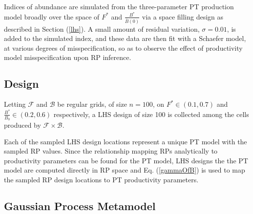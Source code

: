 %
%


%

Indices of abundance are simulated from the three-parameter PT production model
broadly over the space of $F^*$ and $\frac{B^*}{\bar B(0)}$ via a space filling
design as described in Section (\ref{lhs}). A small amount of residual variation,
$\sigma=0.01$, is added to the simulated index, and these data are then fit with a
Schaefer model, at various degrees of misspecification, so as to observe the
effect of productivity model misspecification upon RP inference.

%
\subsection{Design}

%
Letting $\mathcal{F}$ and $\mathcal{B}$ be regular grids, of size $n=100$, on
\mbox{$F^*\in(0.1, 0.7)$} and \mbox{$\frac{B^*}{B_0}\in(0.2, 0.6)$}
respectively, a LHS design of size 100 is collected among the cells produced by
$\mathcal{F}\times\mathcal{B}$. 

%
Each of the sampled LHS design locations represent a unique PT model with the
sampled RP values. Since the relationship mapping RPs analytically to productivity
parameters can be found for the PT model, LHS designs the the PT model are 
computed directly in RP space and Eq. (\ref{gammaOfB}) is used to map the
sampled RP design locations to PT productivity parameters.

%
\subsection{Gaussian Process Metamodel\label{gpmm}}
%

